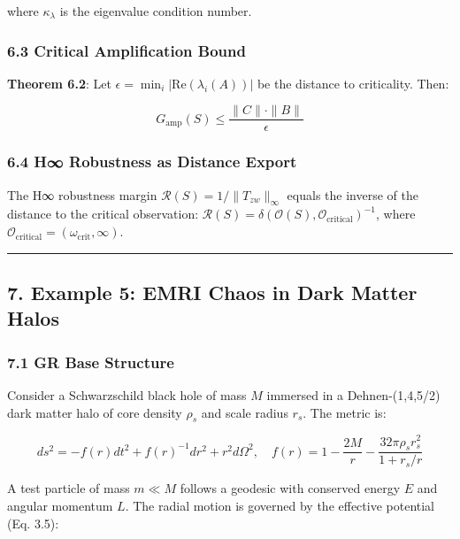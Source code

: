 \documentclass[
]{article}
\begin{document}
where \(\kappa_\lambda\) is the eigenvalue condition number.

\subsubsection{6.3 Critical Amplification
Bound}\label{critical-amplification-bound}

\textbf{Theorem 6.2}: Let
\(\epsilon = \min_i |\text{Re}(\lambda_i(A))|\) be the distance to
criticality. Then:

\[G_{\text{amp}}(S) \leq \frac{\|C\| \cdot \|B\|}{\epsilon}\]

\subsubsection{6.4 H∞ Robustness as Distance
Export}\label{h-robustness-as-distance-export}

The H∞ robustness margin \(\mathcal{R}(S) = 1/\|T_{zw}\|_\infty\) equals
the inverse of the distance to the critical observation:
\(\mathcal{R}(S) = \delta(\mathcal{O}(S), \mathcal{O}_{\text{critical}})^{-1}\),
where
\(\mathcal{O}_{\text{critical}} = (\omega_{\text{crit}}, \infty)\).

\begin{center}\rule{0.5\linewidth}{0.5pt}\end{center}

\subsection{7. Example 5: EMRI Chaos in Dark Matter
Halos}\label{example-5-emri-chaos-in-dark-matter-halos}

\subsubsection{7.1 GR Base Structure}\label{gr-base-structure}

Consider a Schwarzschild black hole of mass \(M\) immersed in a
Dehnen-(1,4,5/2) dark matter halo of core density \(\rho_s\) and scale
radius \(r_s\). The metric is:

\[ds^2 = -f(r)dt^2 + f(r)^{-1}dr^2 + r^2 d\Omega^2, \quad f(r) = 1 - \frac{2M}{r} - \frac{32\pi\rho_s r_s^2}{1 + r_s/r}\]

A test particle of mass \(m \ll M\) follows a geodesic with conserved
energy \(E\) and angular momentum \(L\). The radial motion is governed
by the effective potential (Eq. 3.5):
\end{document}
